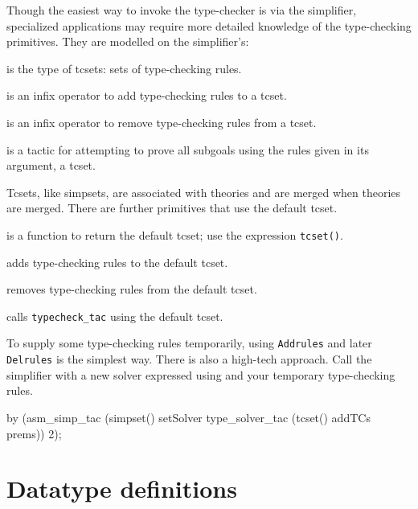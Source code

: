 Though the easiest way to invoke the type-checker is via the simplifier,
specialized applications may require more detailed knowledge of
the type-checking primitives.  They are modelled on the simplifier's:
\begin{ttdescription}
\item[\ttindexbold{tcset}] is the type of tcsets: sets of type-checking rules.

\item[\ttindexbold{addTCs}] is an infix operator to add type-checking rules to
  a tcset.
  
\item[\ttindexbold{delTCs}] is an infix operator to remove type-checking rules
  from a tcset.

\item[\ttindexbold{typecheck_tac}] is a tactic for attempting to prove all
  subgoals using the rules given in its argument, a tcset.
\end{ttdescription}

Tcsets, like simpsets, are associated with theories and are merged when
theories are merged.  There are further primitives that use the default tcset.
\begin{ttdescription}
\item[\ttindexbold{tcset}] is a function to return the default tcset; use the
  expression \texttt{tcset()}.

\item[\ttindexbold{AddTCs}] adds type-checking rules to the default tcset.
  
\item[\ttindexbold{DelTCs}] removes type-checking rules from the default
  tcset.

\item[\ttindexbold{Typecheck_tac}] calls \texttt{typecheck_tac} using the
  default tcset.
\end{ttdescription}

To supply some type-checking rules temporarily, using \texttt{Addrules} and
later \texttt{Delrules} is the simplest way.  There is also a high-tech
approach.  Call the simplifier with a new solver expressed using
 and your temporary type-checking rules.
\begin{ttbox}
by (asm_simp_tac 
     (simpset() setSolver type_solver_tac (tcset() addTCs prems)) 2);
\end{ttbox}



\section{Datatype definitions}
\label{sec:ZF:datatype}

